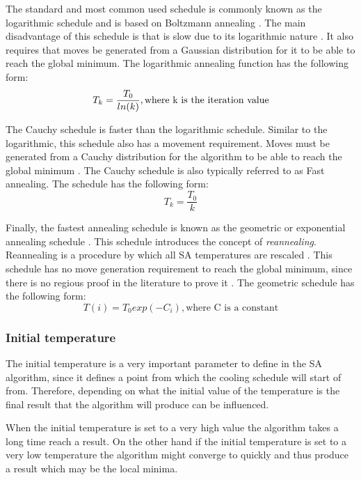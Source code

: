 The standard and most common used schedule is commonly known as the logarithmic schedule and is based on Boltzmann annealing \cite{VeryFastSAImageEnchancement}. The main disadvantage of this schedule is that is slow due to its logarithmic nature \cite{VeryFastSAImageEnchancement}. It also requires that moves be generated from a Gaussian distribution \cite{SASingleMultiObj} for it to be able to reach the global minimum. The logarithmic annealing function has the following form:
\begin{equation}
	T_k = \frac{T_0}{ln(k)},\text{where k is the iteration value}\\
\end{equation}

The Cauchy schedule is faster than the logarithmic schedule. Similar to the logarithmic, this schedule also has a movement requirement. Moves must be generated from a Cauchy distribution for the algorithm to be able to reach the global minimum \cite{SASingleMultiObj,VeryFastSAImageEnchancement}. The Cauchy schedule is also typically referred to as Fast annealing. The schedule has the following form:
\begin{equation}
	T_k = \frac{T_0}{k}
\end{equation}

Finally, the fastest annealing schedule is known as the geometric or exponential annealing schedule \cite{SASingleMultiObj}. This schedule introduces the concept of \emph{reannealing}. Reannealing is a procedure by which all SA temperatures are rescaled \cite{VeryFastSAImageEnchancement}. This schedule has no move generation requirement to reach the global minimum, since there is no regious proof in the literature to prove it \cite{SASingleMultiObj}. The geometric schedule has the following form:
\begin{equation}
	T(i)=T_0exp(-C_i),\text{where C is a constant}
\end{equation}
\subsubsection{Initial temperature}
The initial temperature is a very important parameter to define in the SA algorithm, since it defines a point from which the cooling schedule will start of from. Therefore, depending on what the initial value of the temperature is the final result that the algorithm will produce can be influenced\cite{SALongestCommon,VariousCoolingSA,AutoConfigSA}.

When the initial temperature is set to a very high value the algorithm takes a long time reach a result. On the other hand if the initial temperature is set to a very low temperature the algorithm might converge to quickly and thus produce a result which may be the local minima\cite{SALongestCommon,VariousCoolingSA,AutoConfigSA}.

